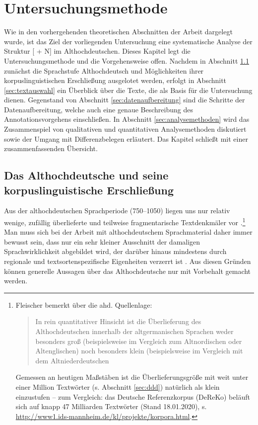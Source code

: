\chapter{Untersuchungsmethode}\label{methode}

Wie in den vorhergehenden theoretischen Abschnitten der Arbeit dargelegt wurde, ist das Ziel der vorliegenden Untersuchung eine systematische Analyse der Struktur [ + N] im Althochdeutschen. Dieses Kapitel legt die Untersuchungsmethode und die Vorgehensweise offen. Nachdem in Abschnitt \ref{sec:ahd} zunächst die Sprachstufe Althochdeutsch und Möglichkeiten ihrer korpuslinguistischen Erschließung ausgelotet werden, erfolgt in Abschnitt \ref{sec:textauswahl} ein Überblick über die Texte, die als Basis für die Untersuchung dienen. Gegenstand von Abschnitt \ref{sec:datenaufbereitung} sind die Schritte der Datenaufbereitung, welche auch eine genaue Beschreibung des Annotationsvorgehens einschließen. In Abschnitt \ref{sec:analysemethoden} wird das Zusammenspiel von qualitativen und quantitativen Analysemethoden diskutiert sowie der Umgang mit Differenzbelegen erläutert. Das Kapitel schließt mit einer zusammenfassenden Übersicht. 

\section{Das Althochdeutsche und seine korpuslinguistische Erschließung}\label{sec:ahd}

Aus der althochdeutschen Sprachperiode (750--1050) liegen uns nur relativ wenige, zufällig überlieferte und teilweise fragmentarische Textdenkmäler vor \parencite[zur Überlieferungsproblematik s. ausführlich][49--105]{Sonderegger2003}.\footnote{Fleischer bemerkt über die ahd. Quellenlage: \blockcquote[27]{Fleischer2006}{In rein quantitativer Hinsicht ist die Überlieferung des Althochdeutschen innerhalb der altgermanischen Sprachen weder besonders groß (beispielsweise im Vergleich zum Altnordischen oder Altenglischen) noch besonders  klein (beispielsweise im Vergleich mit dem Altniederdeutschen}. Gemessen an heutigen Maßstäben ist die Überlieferungsgröße mit weit unter einer Million Textwörter (s. Abschnitt \ref{sec:ddd}) natürlich als klein einzustufen -- zum Vergleich: das Deutsche Referenzkorpus (DeReKo) beläuft sich auf knapp 47 Milliarden Textwörter (Stand 18.01.2020), s. \url{http://www1.ids-mannheim.de/kl/projekte/korpora.html}.} Man muss sich bei der Arbeit mit althochdeutschem Sprachmaterial daher immer bewusst sein, dass  nur ein sehr kleiner Ausschnitt der damaligen Sprachwirklichkeit abgebildet wird, der darüber hinaus mindestens durch regionale und textsortenspezifische Eigenheiten verzerrt ist  \parencite[27ff.]{Fleischer2006}. Aus diesen Gründen können generelle Aussagen über das Althochdeutsche nur mit Vorbehalt gemacht werden. 

